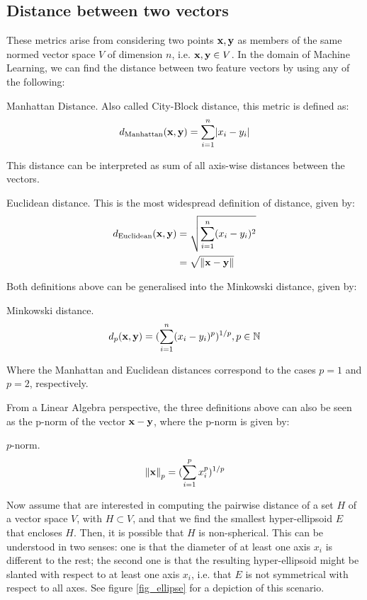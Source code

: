 \documentclass[../main.tex]{subfiles} \label{chapter_soa}
\begin{document}
\subsection{Distance between two vectors}\label{subsection_eucdist}
These metrics arise from considering two points $\mathbf{x, y}$ as members of the same normed vector space $V$ of dimension $n$, i.e. $\mathbf{x,y} \in V$. In the domain of Machine Learning, we can find the distance between two feature vectors by using any of the following:
\begin{definition}{Manhattan Distance.} \label{def_manhattan}
Also called City-Block distance, this metric is defined as:
\begin{align*}
d_{\text{Manhattan}}(\mathbf{x}, \mathbf{y}) = \sum_{i=1}^n\lvert x_i-y_i\rvert
\end{align*}
\end{definition}
\par This distance can be interpreted as sum of all axis-wise distances between the vectors.
\begin{definition}{Euclidean distance.} \label{def_euclidean}
This is the most widespread definition of distance, given by:
\begin{align*}
d_{\text{Euclidean}}(\mathbf{x}, \mathbf{y}) &= \sqrt{\sum_{i=1}^n(x_i-y_i)^2}\\
&= \sqrt{\left\lVert\mathbf{x}-\mathbf{y}\right\rVert}
\end{align*}
\end{definition}
\par Both definitions above can be generalised into the Minkowski distance, given by:
\begin{definition}{Minkowski distance.} \label{def_minkowski}
\begin{align*}
d_{p}(\mathbf{x}, \mathbf{y}) = (\sum_{i=1}^n(x_i-y_i)^{p})^{1/p}, p\in\mathbb{N}
\end{align*}
\end{definition}
\par Where the Manhattan and Euclidean distances correspond to the cases $p=1$ and $p=2$, respectively.
\par From a Linear Algebra perspective, the three definitions above can also be seen as the p-norm of the vector $\mathbf{x}-\mathbf{y}$, where the p-norm is given by:
\begin{definition}{$p$-norm.} \label{def_pnorm}
\begin{align*}
\left\lVert\mathbf{x}\right\rVert_p = (\sum_{i=1}^px_i^p)^{1/p}
\end{align*}
\end{definition}
\par Now assume that are interested in computing the pairwise distance of a set $H$ of a vector space $V$, with $H \subset V$, and that we find the smallest hyper-ellipsoid $E$ that encloses $H$. Then, it is possible that $H$ is non-spherical. This can be understood in two senses: one is that the diameter of at least one axis $x_i$ is different to the rest; the second one is that the resulting hyper-ellipsoid might be slanted with respect to at least one axis $x_i$, i.e. that  $E$ is not symmetrical with respect to all axes. See figure \ref{fig_ellipse} for a depiction of this scenario.
\end{document}
